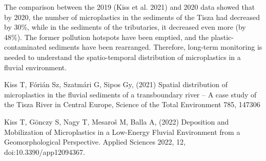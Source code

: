 {The comparison between the 2019 (Kiss et al. 2021) and 2020 data showed that by 2020, the number of microplastics in the sediments of the Tisza had decreased by 30\%, while in the sediments of the tributaries, it decreased even more (by 48\%). The former pollution hotspots have been emptied, and the plastic-contaminated sediments have been rearranged. Therefore, long-term monitoring is needed to understand the spatio-temporal distribution of microplastics in a fluvial environment.
}
{Kiss T, Fórián Sz, Szatmári G, Sipos Gy, (2021) Spatial distribution of microplastics in the fluvial sediments of a transboundary river – A case study of the Tisza River in Central Europe, Science of the Total Environment 785, 147306

Kiss T, Gönczy S, Nagy T, Mesaroš M, Balla A, (2022) Deposition and Mobilization of Microplastics in a Low-Energy Fluvial Environment from a Geomorphological Perspective. Applied Sciences 2022, 12, doi:10.3390/app12094367.
}

